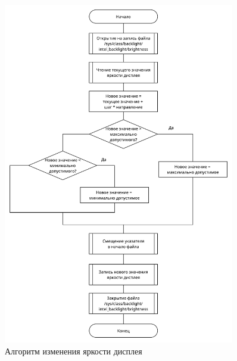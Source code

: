 \begin{figure}[!htb]\centering
	\includegraphics[width=0.9\textwidth]{../img/brightness.pdf}
	\caption{Алгоритм изменения яркости дисплея}
	\label{img:brightness}
\end{figure}

